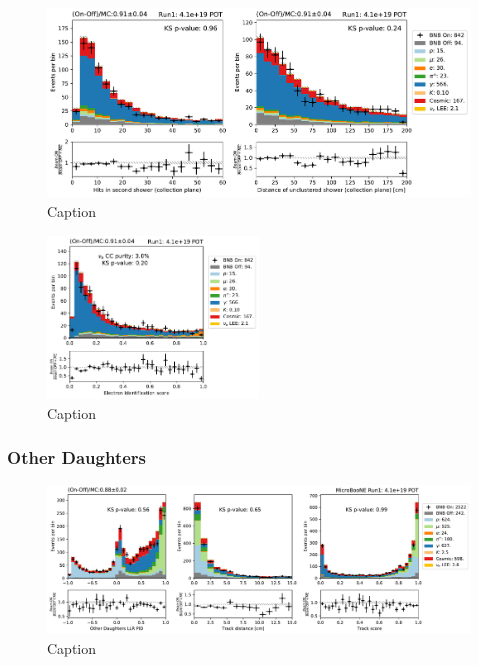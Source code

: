 \begin{figure}
    \centering
    \includegraphics[width=\textwidth]{NueCCsel/Images/run1/e_cand_secondshower.pdf}
    \caption{Caption}
    \label{fig:e_cand_secondshower}
\end{figure}

\begin{figure}
    \centering
    \includegraphics[width=0.5\textwidth]{NueCCsel/Images/run1/pre_e_score.pdf}
    \caption{Caption}
    \label{fig:pre_shower_E_pdg}
\end{figure}


\subsubsection{Other Daughters}

\begin{figure}
    \centering
    \includegraphics[width=\textwidth]{NueCCsel/Images/run1/pre_daughter_1.pdf}
    \caption{Caption}
    \label{fig:pre_daughter_1}
\end{figure}

